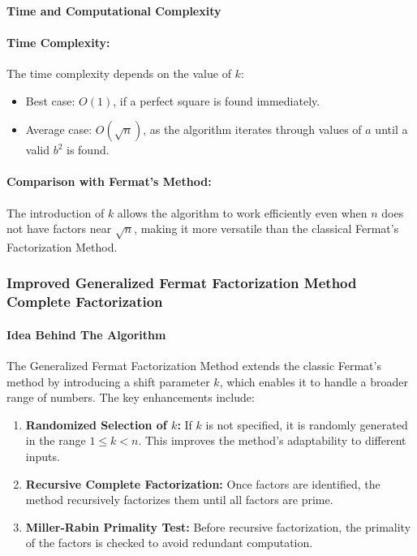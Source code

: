 \documentclass[12pt]{report}
\begin{document}
\paragraph{Time and Computational Complexity}

\paragraph{Time Complexity:}  
The time complexity depends on the value of $k$:
\begin{itemize}
    \item Best case: $O(1)$, if a perfect square is found immediately.
    \item Average case: $O(\sqrt{n})$, as the algorithm iterates through values of $a$ until a valid $b^2$ is found.
\end{itemize}

\paragraph{Comparison with Fermat's Method:}  
The introduction of $k$ allows the algorithm to work efficiently even when $n$ does not have factors near $\sqrt{n}$, making it more versatile than the classical Fermat’s Factorization Method.

\subsubsection{Improved Generalized Fermat Factorization Method Complete Factorization}

\paragraph{Idea Behind The Algorithm}

The Generalized Fermat Factorization Method extends the classic Fermat's method by introducing a shift parameter $k$, which enables it to handle a broader range of numbers. The key enhancements include:

\begin{enumerate}
    \item \textbf{Randomized Selection of $k$:}
    If $k$ is not specified, it is randomly generated in the range $1 \leq k < n$. This improves the method's adaptability to different inputs.
    \item \textbf{Recursive Complete Factorization:}  
    Once factors are identified, the method recursively factorizes them until all factors are prime.
    \item \textbf{Miller-Rabin Primality Test:}  
    Before recursive factorization, the primality of the factors is checked to avoid redundant computation.
\end{enumerate}
\end{document}
